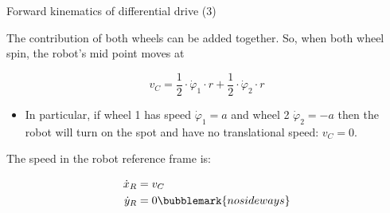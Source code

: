\documentclass[compress]{beamer}
\begin{document}
\begin{frame}{Forward kinematics of differential drive (3)}

    The contribution of both wheels can be added together. So, when both
    wheel spin, the robot's mid point moves at

    \[
    v_C = \frac{1}{2}\cdot \dot\varphi_1\cdot r + \frac{1}{2}\cdot \dot\varphi_2\cdot r
    \]


            \begin{itemize}
                \item In particular, if wheel 1 has speed $\dot\varphi_1 = a$ and wheel 2 $\dot\varphi_2 = -a$ then the robot will turn
                    on the spot and have no translational speed: $v_C = 0$.
            \end{itemize}

    \pause

    The speed in the robot reference frame is:

    \begin{align*}
        \dot{x}_R &= v_C \\
        \dot{y}_R &= 0\bubblemark{nosideways}
    \end{align*}


\end{frame}
\end{document}
